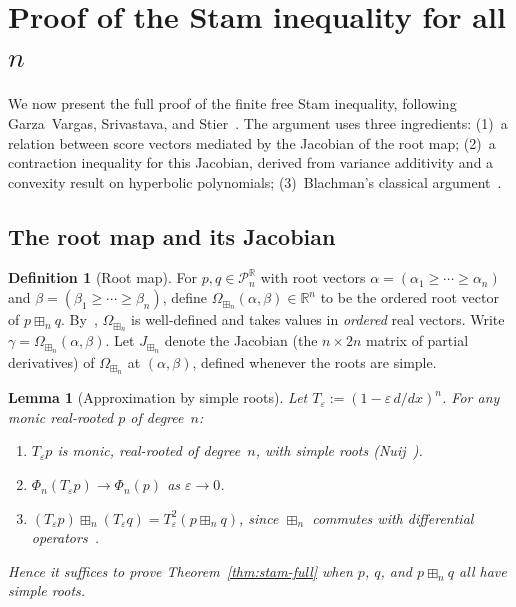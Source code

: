\documentclass[10pt,a4paper]{amsart}
\theoremstyle{plain}
\newtheorem{lemma}[theorem]{Lemma}
\theoremstyle{definition}
\newtheorem{definition}[theorem]{Definition}
\theoremstyle{remark}
\newcommand{\R}{\mathbb{R}}
\newcommand{\PnR}[1][n]{\mathcal{P}^{\R}_{#1}}
\newcommand{\fp}{\boxplus_n}
\begin{document}
\section{Proof of the Stam inequality for all \texorpdfstring{$n$}{n}}
\label{sec:full-proof}

We now present the full proof of the finite free Stam
inequality, following Garza~Vargas, Srivastava, and
Stier~\cite{GVS}.
The argument uses three ingredients:
(1)~a relation between score vectors mediated
by the Jacobian of the root map;
(2)~a contraction inequality for this Jacobian,
derived from variance additivity and a convexity
result on hyperbolic polynomials;
(3)~Blachman's classical argument~\cite{blachman}.

\subsection{The root map and its Jacobian}

\begin{definition}[Root map]\label{def:root-map}
For $p,q\in\PnR$ with root vectors
$\alpha=(\alpha_1\ge\cdots\ge\alpha_n)$ and
$\beta=(\beta_1\ge\cdots\ge\beta_n)$,
define $\Omega_{\fp}(\alpha,\beta)\in\R^n$ to be
the ordered root vector of $p\fp q$.
By~\cite{MSS2}, $\Omega_{\fp}$ is well-defined and
takes values in \emph{ordered} real vectors.
Write $\gamma=\Omega_{\fp}(\alpha,\beta)$.
Let $J_{\fp}$ denote the Jacobian
(the $n\times 2n$ matrix of partial derivatives)
of $\Omega_{\fp}$ at $(\alpha,\beta)$,
defined whenever the roots are simple.
\end{definition}

\begin{lemma}[Approximation by simple roots]
\label{lem:approx}
Let $T_\varepsilon:=(1-\varepsilon\,d/dx)^n$.
For any monic real-rooted $p$ of degree~$n$:
\begin{enumerate}[label=\textup{(\alph*)},nosep]
  \item $T_\varepsilon p$ is monic, real-rooted of
    degree~$n$, with simple roots
    \textup{(}Nuij~\cite{nuij}\textup{)}.
  \item $\Phi_n(T_\varepsilon p)\to\Phi_n(p)$
    as $\varepsilon\to 0$.
  \item $(T_\varepsilon p)\fp(T_\varepsilon q)
    =T_\varepsilon^2(p\fp q)$,
    since $\fp$ commutes with differential
    operators~\cite{MSS2}.
\end{enumerate}
Hence it suffices to prove
Theorem~\textup{\ref{thm:stam-full}}
when $p$, $q$, and $p\fp q$ all have
simple roots.
\end{lemma}
\end{document}
